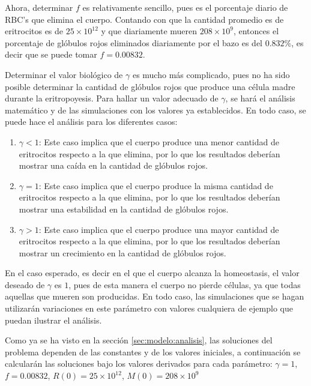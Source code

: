 Ahora, determinar $f$ es relativamente sencillo, pues es el porcentaje diario de RBC's que elimina el cuerpo. Contando con que la cantidad promedio es de eritrocitos es de $25\times 10^{12}$ y que diariamente mueren $208\times 10^{9}$, entonces el porcentaje de glóbulos rojos eliminados diariamente por el bazo es del $0.832\%$, es decir que se puede tomar $f=0.00832$. 

Determinar el valor biológico de $\gamma$ es mucho más complicado, pues no ha sido posible determinar la cantidad de glóbulos rojos que produce una célula madre durante la eritropoyesis. Para hallar un valor adecuado de $\gamma$, se hará el análisis matemático y de las simulaciones con los valores ya establecidos. En todo caso, se puede hace el análisis para los diferentes casos:
\begin{enumerate}
    \item  $\gamma<1$: Este caso implica que el cuerpo produce una menor cantidad de eritrocitos respecto a la que elimina, por lo que los resultados deberían mostrar una caída en la cantidad de glóbulos rojos.
    \item $\gamma=1$: Este caso implica que el cuerpo produce la misma cantidad de eritrocitos respecto a la que elimina, por lo que los resultados deberían mostrar una estabilidad en la cantidad de glóbulos rojos.
    \item  $\gamma>1$: Este caso implica que el cuerpo produce una mayor cantidad de eritrocitos respecto a la que elimina, por lo que los resultados deberían mostrar un crecimiento en la cantidad de glóbulos rojos.
\end{enumerate}

En el caso esperado, es decir en el que el cuerpo alcanza la homeostasis, el valor deseado de $\gamma$ es $1$, pues de esta manera el cuerpo no pierde células, ya que todas aquellas que mueren son producidas. En todo caso, las simulaciones que se hagan utilizarán variaciones en este parámetro con valores cualquiera de ejemplo que puedan ilustrar el análisis.

Como ya se ha visto en la sección \ref{sec:modelo:analisis}, las soluciones del problema dependen de las constantes y de los valores iniciales, a continuación se calcularán las soluciones bajo los valores derivados para cada parámetro: $\gamma = 1$, $f = 0.00832$, $R(0)=25\times 10^{12}$, $M(0)=208\times 10^{9}$ 

